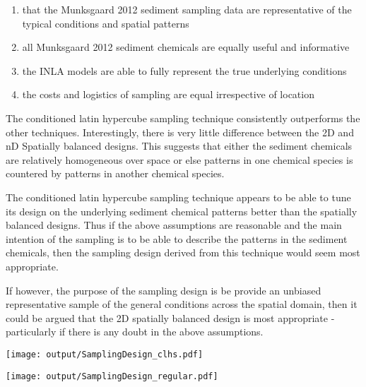 \documentclass[a4paper]{article}
\let\origfigure=\figure
\let\endorigfigure=\endfigure
\renewenvironment{figure}[1][]{%
   \origfigure[H]
}{%
   \endorigfigure
}
\begin{document}
\begin{enumerate}
\def\labelenumi{\arabic{enumi}.}
\tightlist
\item
  that the Munksgaard 2012 sediment sampling data are representative of
  the typical conditions and spatial patterns
\item
  all Munksgaard 2012 sediment chemicals are equally useful and
  informative
\item
  the INLA models are able to fully represent the true underlying
  conditions
\item
  the costs and logistics of sampling are equal irrespective of location
\end{enumerate}

The conditioned latin hypercube sampling technique consistently
outperforms the other techniques. Interestingly, there is very little
difference between the 2D and nD Spatially balanced designs. This
suggests that either the sediment chemicals are relatively homogeneous
over space or else patterns in one chemical species is countered by
patterns in another chemical species.

The conditioned latin hypercube sampling technique appears to be able to
tune its design on the underlying sediment chemical patterns better than
the spatially balanced designs. Thus if the above assumptions are
reasonable and the main intention of the sampling is to be able to
describe the patterns in the sediment chemicals, then the sampling
design derived from this technique would seem most appropriate.

If however, the purpose of the sampling design is be provide an unbiased
representative sample of the general conditions across the spatial
domain, then it could be argued that the 2D spatially balanced design is
most appropriate - particularly if there is any doubt in the above
assumptions.

\begin{figure}
\centering\scriptsize
\texttt{[image: output/SamplingDesign\_clhs.pdf]}
\caption{Sampling configurations associated with the lowest mean Error
for each sample size for cLHS for the East
Arm\label{fig:SamplingDesign_clhs}}
\end{figure}

\begin{figure}
\centering\scriptsize
\texttt{[image: output/SamplingDesign\_regular.pdf]}
\caption{Sampling configurations associated with the lowest mean Error
for each sample size for Regular grid sampling for the East
Arm\label{fig:SamplingDesign_regular}}
\end{figure}
\end{document}
